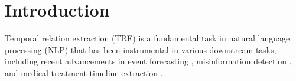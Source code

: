 \section{Introduction}
\label{intro}


Temporal relation extraction (TRE) is a fundamental task in natural language processing (NLP) that has been instrumental in various downstream tasks, including recent advancements in event forecasting \cite{Ma2023ContextawareEF}, misinformation detection \cite{lei-huang-2023-identifying}, and medical treatment timeline extraction \cite{yao-etal-2024-overview}. 

